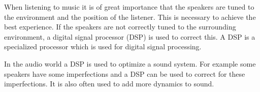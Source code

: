 When listening to music it is of great importance that the speakers are tuned to the environment and the position of the listener. This is necessary to achieve the best experience. If the speakers are not correctly tuned to the surrounding environment, a digital signal processor (DSP) is used to correct this. A DSP is a specialized processor which is used for digital signal processing. 

\noindent In the audio world a DSP is used to optimize a sound system. For example some speakers have some imperfections and a DSP can be used to correct for these imperfections. It is also often used to add more dynamics to sound.
